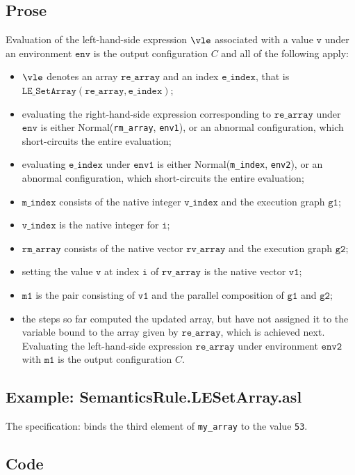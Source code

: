 \documentclass{book}
\newcommand\ProseOrAbnormal[0]{or an abnormal configuration, which short-circuits the entire evaluation}
\newcommand\Normal[0]{\textsf{Normal}}
\newcommand\env[0]{\texttt{env}}
\newcommand\envone[0]{\texttt{env1}}
\newcommand\envtwo[0]{\texttt{env2}}
\newcommand\vi[0]{\texttt{i}}
\newcommand\vv[0]{\texttt{v}}
\newcommand\vvone[0]{\texttt{v1}}
\newcommand\vmone[0]{\texttt{m1}}
\newcommand\vgone[0]{\texttt{g1}}
\newcommand\vgtwo[0]{\texttt{g2}}
\newcommand\eindex[0]{\texttt{e\_index}}
\newcommand\mindex[0]{\texttt{m\_index}}
\newcommand\vindex[0]{\texttt{v\_index}}
\newcommand\rearray[0]{\texttt{re\_array}}
\newcommand\rvarray[0]{\texttt{rv\_array}}
\newcommand\rmarray[0]{\texttt{rm\_array}}
\begin{document}
    \subsection{Prose}
    Evaluation of the left-hand-side expression $\vle$ associated with a
    value $\vv$ under an environment $\env$ is the output configuration $C$
    and all of the following apply:
    \begin{itemize}
    \item $\vle$ denotes an array $\rearray$ and an index $\eindex$,
    that is \\ $\texttt{LE\_SetArray}(\rearray, \eindex)$;
    \item evaluating the right-hand-side expression corresponding to $\rearray$ under $\env$
    is either \Normal(\rmarray, \envone), \ProseOrAbnormal;
    \item evaluating $\eindex$ under $\envone$ is either \Normal(\mindex, \envtwo), \ProseOrAbnormal;
    \item $\mindex$ consists of the native integer $\vindex$ and the execution graph $\vgone$;
    \item $\vindex$ is the native integer for $\vi$;
    \item $\rmarray$ consists of the native vector $\rvarray$ and the execution graph $\vgtwo$;
    \item setting the value $\vv$ at index $\vi$ of $\rvarray$ is the native vector $\vvone$;
    \item $\vmone$ is the pair consisting of $\vvone$ and the parallel composition of $\vgone$ and $\vgtwo$;
    \item the steps so far computed the updated array, but have not assigned it to the variable
    bound to the array given by $\rearray$, which is achieved next.
    Evaluating the left-hand-side expression $\rearray$ under environment $\envtwo$ with $\vmone$
    is the output configuration $C$.
    \end{itemize}

    \subsection{Example: SemanticsRule.LESetArray.asl}
    The specification:
    binds the third element of \texttt{my\_array} to the value \texttt{53}.

  \subsection{Code}
\end{document}
